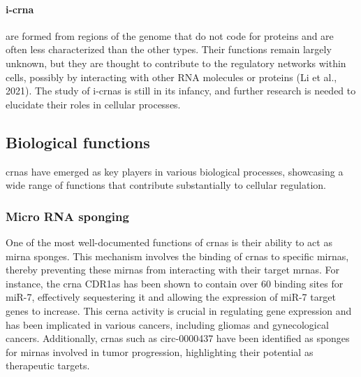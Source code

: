 \paragraph{\gls{i-crna}} are formed from regions of
the
genome
that do not code for proteins and are often less characterized than the other
types.
Their functions remain largely unknown, but they are thought to contribute to
the regulatory networks within cells, possibly by interacting with other RNA
molecules or proteins (Li et al., 2021).
The study of \gls{i-crna}s is still in its infancy, and further research is
needed to elucidate their roles in cellular processes.

\subsection{Biological functions}
\label{sec:circrna_functions}
\gls{crna}s have emerged as key players in various biological processes,
showcasing
a wide range of functions that contribute substantially to cellular regulation.

\subsubsection{Micro RNA sponging}
One of the most well-documented functions of \gls{crna}s is their ability to
act as \gls{mirna} sponges.
This mechanism involves the binding of \gls{crna}s to specific \gls{mirna}s, thereby
preventing these \gls{mirna}s from interacting with their target \gls{mrna}s.
For instance, the \gls{crna} CDR1as has been shown to contain over 60 binding
sites for miR-7, effectively sequestering it and allowing the expression of
miR-7 target genes to
increase\supercite{guo_expanded_2014,yuan_regulatory_2020}.
This \gls{cerna} activity is crucial in regulating gene expression and has been
implicated in various cancers, including gliomas and gynecological
cancers\supercite{dong_expression_2020,song_circular_2016}.
Additionally, \gls{crna}s such as circ-0000437 have been identified as sponges
for \gls{mirna}s involved in tumor progression, highlighting their potential as
therapeutic targets\supercite{li_peptide_2021,cui_circular_2022}.

